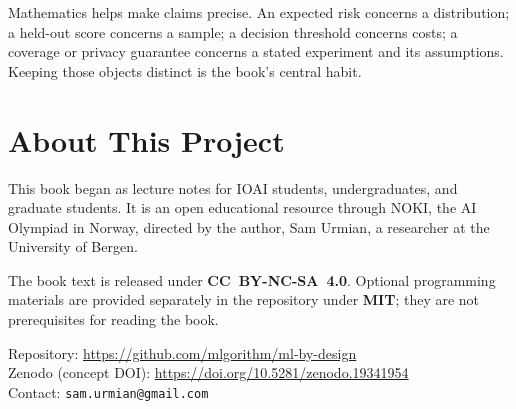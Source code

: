 Mathematics helps make claims precise. An expected risk concerns a distribution; a held-out score concerns a sample; a decision threshold concerns costs; a coverage or privacy guarantee concerns a stated experiment and its assumptions. Keeping those objects distinct is the book's central habit.

\section*{About This Project}

This book began as lecture notes for IOAI students, undergraduates, and graduate students. It is an open educational resource through NOKI, the AI Olympiad in Norway, directed by the author, Sam Urmian, a researcher at the University of Bergen.

The book text is released under \textbf{CC~BY-NC-SA~4.0}. Optional programming materials are provided separately in the repository under \textbf{MIT}; they are not prerequisites for reading the book.

\begin{flushleft}
Repository: \url{https://github.com/mlgorithm/ml-by-design}\\
Zenodo (concept DOI): \url{https://doi.org/10.5281/zenodo.19341954}\\
Contact: \texttt{sam.urmian@gmail.com}
\end{flushleft}
